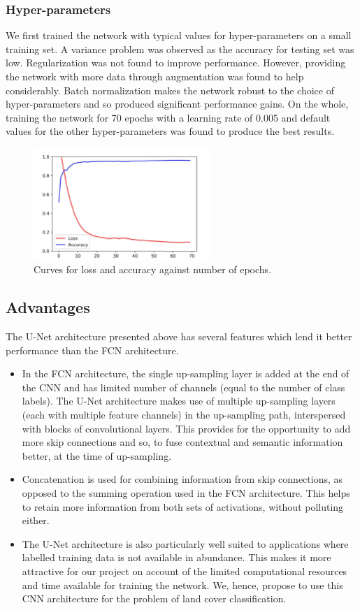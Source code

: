 \documentclass[12pt, a4paper]{report}
\begin{document}
\subsubsection{Hyper-parameters}
We first trained the network with typical values for hyper-parameters on a small training set. A variance problem was observed as the accuracy for testing set was low. Regularization was not found to improve performance. However, providing the network with more data through augmentation was found to help considerably. Batch normalization makes the network robust to the choice of hyper-parameters and so produced significant performance gains. On the whole, training the network for 70 epochs with a learning rate of 0.005 and default values for the other hyper-parameters was found to produce the best results.
\begin{figure}[h]
\centering
\includegraphics[width=0.6\textwidth]{train_history.jpg}
\caption{Curves for loss and accuracy against number of epochs.}
\end{figure}
\subsection{Advantages}
The U-Net architecture presented above has several features which lend it better performance than the FCN architecture.
\begin{itemize}
\item
In the FCN architecture, the single up-sampling layer is added at the end of the CNN and has limited number of channels (equal to the number of class labels). The U-Net architecture makes use of multiple up-sampling layers (each with multiple feature channels) in the up-sampling path, interspersed with blocks of convolutional layers. This provides for the opportunity to add more skip connections and so, to fuse contextual and semantic information better, at the time of up-sampling. 
\item
Concatenation is used for combining information from skip connections, as opposed to the summing operation used in the FCN architecture. This helps to retain more information from both sets of activations, without polluting either.
\item
The U-Net architecture is also particularly well suited to applications where labelled training data is not available in abundance. This makes it more attractive for our project on account of the limited computational resources and time available for training the network. We, hence, propose to use this CNN architecture for the problem of land cover classification.
\end{itemize}
\end{document}

